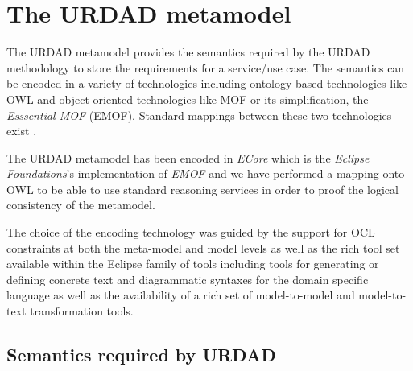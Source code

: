 \section{The URDAD metamodel \label{sec:metamodel}}

The URDAD metamodel provides the semantics required by the URDAD methodology to store the requirements for a service/use case. The semantics can be encoded in a variety of technologies including ontology based technologies like OWL and object-oriented technologies like MOF or its simplification, the {\em Esssential MOF} (EMOF). Standard mappings between these two technologies exist \cite{staab_model_2010}.

The URDAD metamodel has been encoded in {\em ECore} which is the {\em Eclipse Foundations}'s implementation of {\em EMOF} and we have performed a mapping onto OWL to be able to use standard reasoning services in order to proof the logical consistency of the metamodel. 

The choice of the encoding technology was guided by the support for OCL constraints at both the meta-model and model levels as well as the rich tool set available within the Eclipse family of tools including tools for generating or defining concrete text and diagrammatic syntaxes for the domain specific language as well as the availability of a rich set of model-to-model and model-to-text transformation tools.


\subsection{Semantics required by URDAD}

